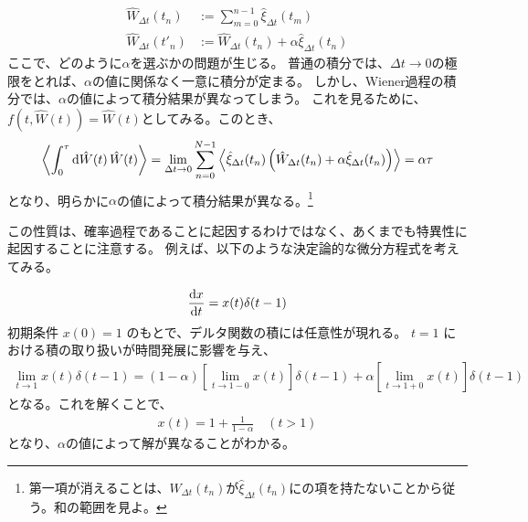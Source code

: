 \documentclass[a4paper,11pt]{jsarticle}
\numberwithin{equation}{section}
\begin{document}
\begin{align}
\hat{W}_{\Delta t}(t_n) &:= \sum_{m=0}^{n-1} \hat{\xi}_{\Delta t}(t_m) \\
\hat{W}_{\Delta t}(t'_n) &:= \hat{W}_{\Delta t}(t_n) + \alpha \hat{\xi}_{\Delta t}(t_n)
\end{align}
ここで、どのように$\alpha$を選ぶかの問題が生じる。
普通の積分では、$\Delta t \to 0$の極限をとれば、$\alpha$の値に関係なく一意に積分が定まる。
しかし、Wiener過程の積分では、$\alpha$の値によって積分結果が異なってしまう。
これを見るために、$f(t,\hat{W}(t)) = \hat{W}(t)$としてみる。このとき、
\begin{align}
\left\langle \int_0^\tau \dd{\hat{W}(t)} \hat{W}(t) \right\rangle 
= \lim_{\Delta t \to 0} \sum_{n=0}^{N-1} \ev{\hat{\xi}_{\Delta t}(t_n) \left( \hat{W}_{\Delta t}(t_n) + \alpha \hat{\xi}_{\Delta t}(t_n) \right)}
= \alpha \tau
\end{align}
となり、明らかに$\alpha$の値によって積分結果が異なる。\footnote{第一項が消えることは、$\hat{W}_{\Delta t}(t_n)$が$\hat{\xi}_{\Delta t}(t_n)$にの項を持たないことから従う。和の範囲を見よ。}

この性質は、確率過程であることに起因するわけではなく、あくまでも特異性に起因することに注意する。
例えば、以下のような決定論的な微分方程式を考えてみる。

\begin{align}
\dv{x}{t} = x(t)\delta(t - 1)
\end{align}
初期条件 $x(0) = 1$ のもとで、デルタ関数の積には任意性が現れる。
$t = 1$ における積の取り扱いが時間発展に影響を与え、
\begin{align}
\lim_{t \to 1} x(t)\delta(t - 1)
= (1 - \alpha) \left[ \lim_{t \to 1 - 0} x(t) \right] \delta(t - 1)
+ \alpha \left[ \lim_{t \to 1 + 0} x(t) \right] \delta(t - 1)
\end{align}
となる。これを解くことで、
\begin{align}
  x(t) = 1 + \frac{1}{1 - \alpha} \quad (t > 1)
\end{align}
となり、$\alpha$の値によって解が異なることがわかる。\\
\end{document}
